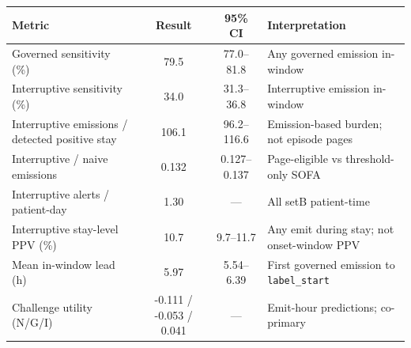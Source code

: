 \begin{tabular}{@{}p{3.1cm}ccp{5.1cm}@{}}
\toprule
Metric & Result & 95\% CI & Interpretation \\
\midrule
Governed sensitivity (\%) & 79.5 & 77.0--81.8 & Any governed emission in-window \\
Interruptive sensitivity (\%) & 34.0 & 31.3--36.8 & Interruptive emission in-window \\
Interruptive emissions / detected positive stay & 106.1 & 96.2--116.6 & Emission-based burden; not episode pages \\
Interruptive / naive emissions & 0.132 & 0.127--0.137 & Page-eligible vs threshold-only SOFA \\
Interruptive alerts / patient-day & 1.30 & --- & All setB patient-time \\
Interruptive stay-level PPV (\%) & 10.7 & 9.7--11.7 & Any emit during stay; not onset-window PPV \\
Mean in-window lead (h) & 5.97 & 5.54--6.39 & First governed emission to \texttt{label\_start} \\
Challenge utility (N/G/I) & -0.111 / -0.053 / 0.041 & --- & Emit-hour predictions; co-primary \\
\bottomrule
\end{tabular}
